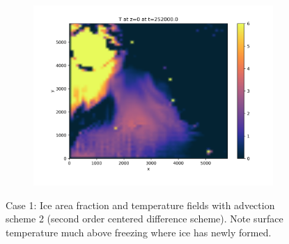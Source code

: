 \documentclass[11pt]{article}
\begin{document}
\begin{figure}[h!]
	\begin{subfigure}{0.85\textwidth}
		\includegraphics[width=\textwidth]{iceAdvect/advScheme-def-surface-T-hd-0000025200.png}
	\end{subfigure}
\caption{Case 1: Ice area fraction and temperature fields with advection scheme 2 (second order centered difference scheme). Note surface temperature much above freezing where ice has newly formed.}
\label{fig:advScheme2}
\end{figure}
\end{document}
